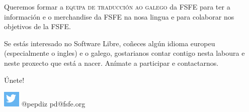 \documentclass[10pt,foldmark,tumble]{leaflet}
\begin{document}
\begin{mdframed}[style=MyFrame]
Queremos formar a \textsc{equipa de traducción ao galego} da FSFE para ter a información e o merchandise da FSFE na nosa lingua e para colaborar nos objetivos de la FSFE.

Se estás interesado no Software Libre, coñeces algún idioma europeu (especialmente o ingles) e o galego, gostarianos contar contigo nesta laboura e neste proxecto que está a nacer. Anímate a participar e contactarnos.

\center \Huge{Únete!}

\includegraphics[scale=0.8]{tw.png} \Large @pepdiz pd@fsfe.org
\end{mdframed}
\end{document}
